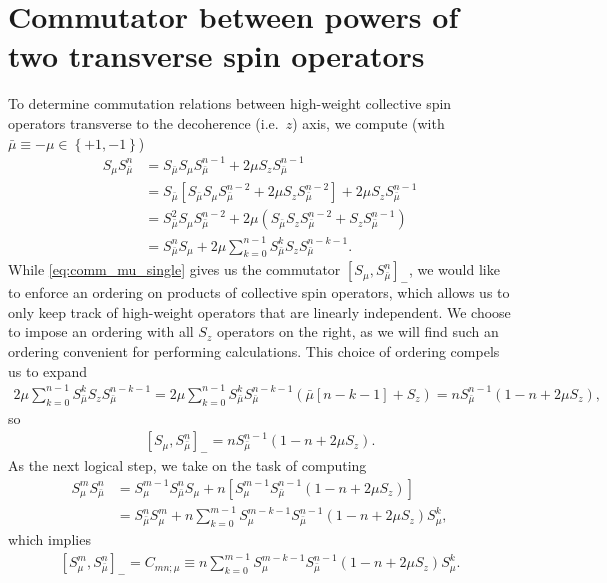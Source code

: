 \documentclass[aps,notitlepage,nofootinbib,11pt]{revtex4-1}
\newcommand{\p}[1]{\left(#1\right)} %
\renewcommand{\sp}[1]{\left[#1\right]} %
\renewcommand{\set}[1]{\left\{#1\right\}} %
\newcommand{\bmu}{{\bar\mu}}
\newcommand{\1}{\mathds{1}}
\begin{document}
\section{Commutator between powers of two transverse spin operators}
\label{sec:comm_transverse}

To determine commutation relations between high-weight collective spin
operators transverse to the decoherence (i.e.~$z$) axis, we compute
(with $\bmu\equiv-\mu\in\set{+1,-1}$)
\begin{align}
  S_\mu S_\bmu^n
  &= S_\bmu S_\mu S_\bmu^{n-1} + 2\mu S_z S_\bmu^{n-1} \\
  &= S_\bmu \sp{S_\bmu S_\mu S_\bmu^{n-2} + 2\mu S_z S_\bmu^{n-2}}
  + 2\mu S_z S_\bmu^{n-1} \\
  &= S_\bmu^2 S_\mu S_\bmu^{n-2}
  + 2\mu \p{S_\bmu S_z S_\bmu ^{n-2} + S_z S_\bmu^{n-1}} \\
  &= S_\bmu^n S_\mu + 2\mu \sum_{k=0}^{n-1} S_\bmu^k S_z S_\bmu^{n-k-1}.
  \label{eq:comm_mu_single}
\end{align}
While \eqref{eq:comm_mu_single} gives us the commutator
$\sp{S_\mu,S_\bmu^n}_-$, we would like to enforce an ordering on
products of collective spin operators, which allows us to only keep
track of high-weight operators that are linearly independent.  We
choose to impose an ordering with all $S_z$ operators on the right, as
we will find such an ordering convenient for performing calculations.
This choice of ordering compels us to expand
\begin{align}
  2 \mu \sum_{k=0}^{n-1} S_\bmu^k S_z S_\bmu^{n-k-1}
  = 2 \mu \sum_{k=0}^{n-1}
  S_\bmu^k S_\bmu^{n-k-1} \p{\bmu\sp{n-k-1} + S_z}
  = n S_\bmu^{n-1}\p{1 - n + 2\mu S_z},
\end{align}
so
\begin{align}
  \sp{S_\mu, S_\bmu^n}_-
  = n S_\bmu^{n-1}\p{1 - n + 2\mu S_z}.
\end{align}
As the next logical step, we take on the task of computing
\begin{align}
  S_\mu^m S_\bmu^n
  &= S_\mu^{m-1} S_\bmu^n S_\mu
  + n \sp{S_\mu^{m-1} S_\bmu^{n-1} \p{1 - n + 2\mu S_z}} \\
  &= S_\bmu^n S_\mu^m
  + n \sum_{k=0}^{m-1} S_\mu^{m-k-1} S_\bmu^{n-1}
  \p{1 - n + 2\mu S_z} S_\mu^k,
\end{align}
which implies
\begin{align}
  \sp{S_\mu^m, S_\bmu^n}_-
  = C_{mn;\mu}
  \equiv n \sum_{k=0}^{m-1} S_\mu^{m-k-1} S_\bmu^{n-1}
  \p{1 - n + 2\mu S_z} S_\mu^k.
\end{align}
\end{document}
